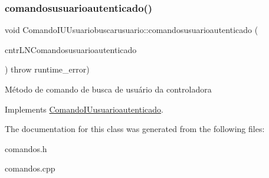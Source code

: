 \subsubsection{\texorpdfstring{comandosusuarioautenticado()}{comandosusuarioautenticado()}}
{\footnotesize\ttfamily void Comando\+I\+U\+Usuariobuscarusuario\+::comandosusuarioautenticado (\begin{DoxyParamCaption}\item[{\hyperlink{classILNComandosusuarioautenticado}{I\+L\+N\+Comandosusuarioautenticado} $\ast$}]{cntr\+L\+N\+Comandosusuarioautenticado }\end{DoxyParamCaption}) throw  runtime\+\_\+error) \hspace{0.3cm}{\ttfamily [virtual]}}

Método de comando de busca de usuário da controladora 

Implements \hyperlink{classComandoIUusuarioautenticado}{Comando\+I\+Uusuarioautenticado}.



The documentation for this class was generated from the following files\+:\begin{DoxyCompactItemize}
\item 
comandos.\+h\item 
comandos.\+cpp\end{DoxyCompactItemize}
